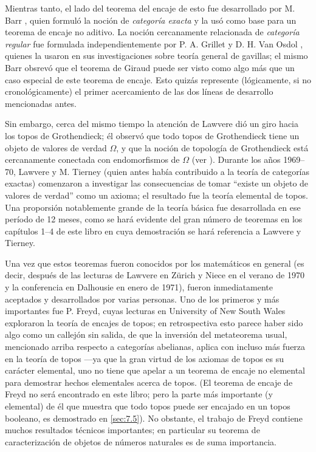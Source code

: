 Mientras tanto, el lado del teorema del encaje de esto fue desarrollado por M.
Barr \pend{[2]}, quien formuló la  noción de \emph{categoría exacta} y la usó
como base para un teorema de encaje no aditivo. La noción cercanamente
relacionada de \emph{categoría regular} fue formulada independientemente por P.
A. Grillet \pend{[41]} y D. H. Van Osdol \pend{[122]}, quienes la usaron en sus
investigaciones sobre teoría general de gavillas; el mismo Barr obsrevó que el
teorema de Giraud puede ser visto como algo más que un caso especial de este
teorema de encaje. Esto quizás represente (lógicamente, si no cronológicamente)
el primer acercamiento de las dos líneas de desarrollo mencionadas antes.

Sin embargo, cerca del mismo tiempo la atención de Lawvere dió un giro hacia los
topos de Grothendieck; él observó que todo topos de Grothendieck tiene un objeto
de valores de verdad \(\Omega\), y que la noción de topología de Grothendieck
está cercanamente conectada con endomorfismos de \(\Omega\) (ver \pend{[LH]}).
Durante los años 1969--70, Lawvere y M. Tierney (quien antes había contribuido a
la teoría de categorías exactas) comenzaron a investigar las consecuencias de
tomar \enquote{existe un objeto de valores de verdad} como un axioma; el
resultado fue la teoría elemental de topos. Una proporsión notablemente grande
de la teoría básica fue desarrollada en ese período de 12 meses, como se hará
evidente del gran número de teoremas en los capítulos 1--4 de este libro en cuya
demostración se hará referencia a Lawvere y Tierney. 

Una vez que estos teoremas fueron conocidos por los matemáticos en general (es
decir, después de las lecturas de Lawvere en Zürich y Niece \pend{[LN]} en el
verano de 1970 y la conferencia en Dalhousie \pend{[LH]} en enero de 1971),
fueron inmediatamente aceptados y desarrollados por varias personas. Uno de los
primeros y más importantes fue P. Freyd, cuyas lecturas en University of New
South Wales \pend{[FK]} exploraron la teoría de encajes de topos; en
retrospectiva esto parece haber sido algo como un callejón sin salida, de que la
inversión del metateorema usual, mencionado arriba respecto a categorías
abelianas, aplica con incluso más fuerza en la teoría de topos ---ya que la gran
virtud de los axiomas de topos es su carácter elemental, uno no tiene que apelar
a un teorema de encaje no elemental para demostrar hechos elementales acerca de
topos. (El teorema de encaje de Freyd no será encontrado en este libro; pero la
parte más importante (y elemental) de él que muestra que todo topos puede ser
encajado en un topos booleano, es demostrado en \autoref{sec:7.5}). No obstante,
el trabajo de Freyd contiene muchos resultados técnicos importantes; en
particular su teorema de caracterización de objetos de números naturales es de
suma importancia.